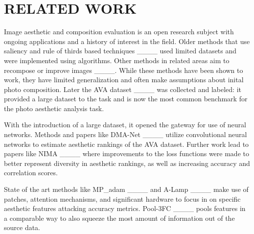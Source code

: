 \section{RELATED WORK}
Image aesthetic and composition evaluation is an open research subject with ongoing applications and a history of interest in the field. Older methods that use saliency and rule of thirds based techniques ____ used limited datasets and were implemented using algorithms. Other methods in related areas aim to recompose or improve images ____. While these methods have been shown to work, they have limited generalization and often make assumptions about inital photo composition. Later the AVA dataset ____ was collected and labeled: it provided a large dataset to the task and is now the most common benchmark for the photo aesthetic analysis task.

With the introduction of a large dataset, it opened the gateway for use of neural networks.  Methods and papers like  DMA-Net ____ utilize convolutional neural networks to estimate aesthetic rankings of the AVA dataset. Further work lead to papers like NIMA ____ where improvements to the loss functions were made to better represent diversity in aesthetic rankings, as well as increasing accuracy and correlation scores. 

State of the art methods like MP\_adam ____ and A-Lamp ____ make use of patches, attention mechanisms, and significant hardware to focus in on specific aesthetic features attacking accuracy metrics. Pool-3FC ____  pools features in a comparable way to also squeeze the most amount of information out of the source data.